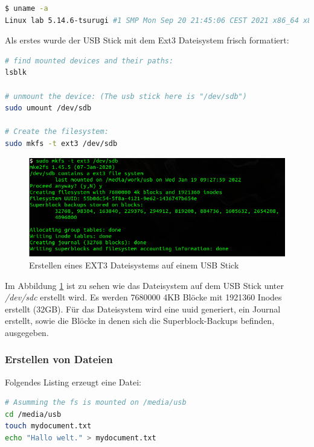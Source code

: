\begin{lstlisting}[language=bash]
$ uname -a
Linux lab 5.14.6-tsurugi #1 SMP Mon Sep 20 21:45:06 CEST 2021 x86_64 x86_64 x86_64 GNU/Li
\end{lstlisting}  

\newpage
	
Als erstes wurde der USB Stick mit dem Ext3 Dateisystem frisch formatiert:

\begin{lstlisting}[language=bash]
# find mounted devices and their paths:
lsblk

# unmount the device: (The usb stick here is "/dev/sdb")
sudo umount /dev/sdb

# Create the filesystem:
sudo mkfs -t ext3 /dev/sdb
\end{lstlisting}  

\begin{figure}[H]
	\centering
	\includegraphics[width=12cm,keepaspectratio=true]{pictures/createfs.png}
	\caption{
		Erstellen eines EXT3 Dateisystems auf einem USB Stick
	}
	\label{fig:createfs}
\end{figure}

Im Abbildung \ref{fig:createfs} ist zu sehen wie das Dateisystem auf dem USB Stick unter \textit{/dev/sdc} erstellt wird. Es werden 7680000 4KB Blöcke mit 1921360 Inodes erstellt (32GB). Für das Dateisystem wird eine \ac{uuid} generiert, ein Journal erstellt, sowie die Blöcke in denen sich die Superblock-Backups befinden, ausgegeben.


\subsubsection{Erstellen von Dateien}

Folgendes Listing erzeugt eine Datei:

\begin{lstlisting}[language=bash]
# Asumming the fs is mounted on /media/usb
cd /media/usb
touch mydocument.txt
echo "Hallo welt." > mydocument.txt
\end{lstlisting} 

